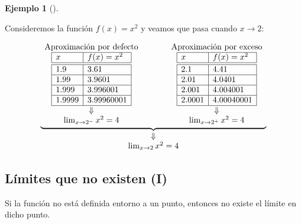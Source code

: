 \documentclass[
  a4paper,
]{scrreport}
\theoremstyle{plain}
\theoremstyle{plain}
\theoremstyle{definition}
\theoremstyle{plain}
\theoremstyle{definition}
\newtheorem{example}{Ejemplo}[chapter]
\theoremstyle{remark}
\begin{document}
\leavevmode{}%
\begin{example}[]\label{exm-limites-aproximados}

Consideremos la función \(f(x)=x^2\) y veamos que pasa cuando
\(x\to 2\):

\[
\begin{array}{c}
\underbrace{\begin{array}{ccc}
\textrm{Aproximación por defecto} & \qquad & \textrm{Aproximación por exceso}\\
\begin{array}{|l|l|}
\hline
x       & f(x)=x^2   \\
\hline\hline
 1.9    & 3.61       \\
\hline
 1.99   & 3.9601     \\
\hline
 1.999  & 3.996001   \\
\hline
 1.9999 & 3.99960001 \\
\hline
\end{array}
& &
\begin{array}{|l|l|}
\hline
x       & f(x)=x^2   \\
\hline\hline
 2.1    & 4.41       \\
\hline
 2.01   & 4.0401    \\
\hline
 2.001  & 4.004001   \\
\hline
 2.0001 & 4.00040001 \\
\hline
\end{array}\\
\Downarrow & & \Downarrow\\
\lim_{x\to 2^-}x^2=4
& &
\lim_{x\to 2^+}x^2=4
\end{array}}\\
\Downarrow\\
\lim_{x\to 2}x^2=4
\end{array}
\]

\end{example}

\hypertarget{luxedmites-que-no-existen-i}{%
\subsection{Límites que no existen
(I)}\label{luxedmites-que-no-existen-i}}

Si la función no está definida entorno a un punto, entonces no existe el
límite en dicho punto.
\end{document}
